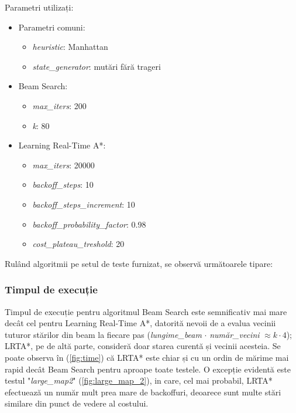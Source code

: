 \documentclass{article}
\begin{document}
Parametri utilizați:
\begin{itemize}
    \item Parametri comuni:
    \begin{itemize}
        \item \textit{heuristic}: Manhattan
        \item \textit{state\_generator}: mutări fără trageri
    \end{itemize}
    \item Beam Search:
    \begin{itemize}
        \item \textit{max\_iters}: 200
        \item \textit{k}: 80
    \end{itemize}
    \item Learning Real-Time A*:
    \begin{itemize}
        \item \textit{max\_iters}: 20000
        \item \textit{backoff\_steps}: 10
        \item \textit{backoff\_steps\_increment}: 10
        \item \textit{backoff\_probability\_factor}: 0.98
        \item \textit{cost\_plateau\_treshold}: 20
    \end{itemize}
\end{itemize}

Rulând algoritmii pe setul de teste furnizat, se observă următoarele tipare:

\subsubsection*{Timpul de execuție}
Timpul de execuție pentru algoritmul Beam Search este semnificativ mai mare
decât cel pentru Learning Real-Time A*, datorită nevoii de a evalua vecinii 
tuturor stărilor din beam la fiecare pas (\textit{lungime\_beam} $\cdot$ 
\textit{număr\_vecini} $\approx k \cdot 4$); LRTA*, pe de altă parte, consideră
doar starea curentă și vecinii acesteia. Se poate observa în (\ref{fig:time}) că
LRTA* este chiar și cu un ordin de mărime mai rapid decât Beam Search pentru 
aproape toate testele. O excepție evidentă este testul "\textit{large\_map2}"
(\ref{fig:large_map_2}), in care, cel mai probabil, LRTA* efectuează un număr 
mult prea mare de backoffuri, deoarece sunt multe stări similare din punct de 
vedere al costului.
\end{document}
